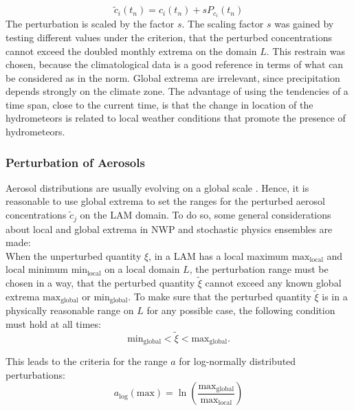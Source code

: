 \begin{equation}
    \tilde{c}_{i}(t_{n}) = c_{i}(t_{n}) + sP_{c_{i}}(t_{n})
    \label{eq:petconhyd}
\end{equation}
The perturbation is scaled by the factor $s$. The scaling factor $s$ was gained by testing different values under the criterion, that the perturbed concentrations cannot exceed the doubled monthly extrema on the domain $L$. This restrain was chosen, because the climatological data is a good reference in terms of what can be considered as in the norm. Global extrema are irrelevant, since precipitation depends strongly on the climate zone. The advantage of using the tendencies of a time span, close to the current time, is that the change in location of the hydrometeors is related to local weather conditions that promote the presence of hydrometeors. 

\subsubsection{Perturbation of Aerosols}
Aerosol distributions are usually evolving on a global scale \cite{tegen1997contribution,chin1996global, liousse1996global,tegen1995contribution}. Hence, it is reasonable to use global extrema to set the ranges for the perturbed aerosol concentrations $ \tilde{c}_{j}$ on the LAM domain. To do so, some general considerations about local and global extrema in NWP and stochastic physics ensembles are made:\\
When the unperturbed quantity $\xi$, in a LAM has a local maximum $\mathrm{max_{local}}$ and local minimum $\mathrm{min_{local}}$ on a local domain $L$, the perturbation range must be chosen in a way, that the perturbed quantity $\tilde{\xi}$ cannot exceed any known global extrema $\mathrm{max_{global}}$ or $\mathrm{min_{global}}$.
To make sure that the perturbed quantity $\tilde{\xi}$ is in a physically reasonable range on $L$ for any possible case, the following condition must hold at all times:
\begin{equation}
\mathrm{min_{global}} < \tilde{\xi} < \mathrm{max_{global}}.
\label{rangecrit}
\end{equation}

This leads to the criteria for the range $a$ for log-normally distributed perturbations:
\begin{equation}
a_{\mathrm{log}}(\mathrm{max}) = \ln \left( \frac{\mathrm{max_{global}}}{\mathrm{max_{local}}} \right)
\label{eq:logmax}
\end{equation}

